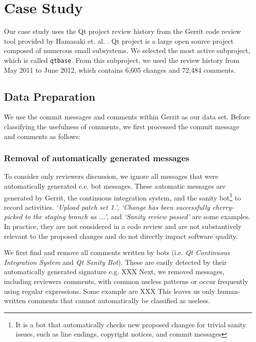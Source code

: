 
\section{Case Study}

Our case study uses the Qt project review history from the Gerrit code review tool provided by Hamasaki et. al. \cite{Hamasaki2013}. Qt project is a large open source project composed of numerous small subsystems. We selected the most active subproject, which is called \texttt{qtbase}.
From this subproject, we used the review history from May 2011 to June 2012, which contains 6,605 changes and 72,484 comments.


\subsection{Data Preparation}
We use the commit messages and comments within Gerrit as our data set.
Before classifying the usefulness of comments, we first processed the commit message and comments as follows: 

\subsubsection{Removal of automatically generated messages} To consider only reviewers discussion, we ignore all messages that were automatically generated e.e. bot messages.
These automatic messages are generated by Gerrit, the continuous integration system, and the sanity bot\footnote{It is a bot that automatically checks new proposed changes for trivial sanity issues, such as line endings, copyright notices, and commit messages} to record activities. \textit{`Upload patch set 1.'}, \textit{`Change has been successfully cherry-picked to the staging branch as ...'}, and \textit{`Sanity review passed'} are some examples. In practice, they are not considered in a code review  and are not substantively relevant to the proposed changes and do not directly impact software quality\cite{Mcintosh}. 

We first find and remove all comments written by bots (i.e. \emph{Qt Continuous Integration System} and \emph{Qt Sanity Bot}). These are easily detected by their automatically generated signature 
e.g. XXX 
Next, we removed messages, including reviewers comments, with common useless patterns or occur frequently using regular expressions. Some example are XXX
This leaves us only human-written comments that cannot automatically be classified as useless.


